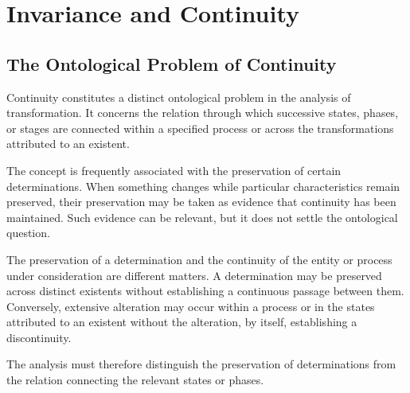 %
%
%
%
%

\section{Invariance and Continuity}
\label{sec:invariance-and-continuity}

\subsection{The Ontological Problem of Continuity}

Continuity constitutes a distinct ontological problem in the
analysis of transformation. It concerns the relation through
which successive states, phases, or stages are connected
within a specified process or across the transformations
attributed to an existent.

The concept is frequently associated with the preservation
of certain determinations. When something changes while
particular characteristics remain preserved, their
preservation may be taken as evidence that continuity
has been maintained. Such evidence can be relevant, but
it does not settle the ontological question.

The preservation of a determination and the continuity
of the entity or process under consideration are different
matters. A determination may be preserved across distinct
existents without establishing a continuous passage
between them. Conversely, extensive alteration may occur
within a process or in the states attributed to an existent
without the alteration, by itself, establishing a
discontinuity.

The analysis must therefore distinguish the preservation
of determinations from the relation connecting the
relevant states or phases.

